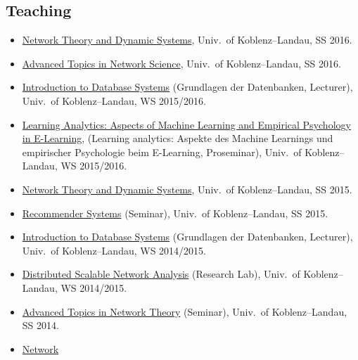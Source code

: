 \documentclass[line,mm]{res}
\begin{document}
\begin{resume}
\section{Teaching}
\begin{itemize}
\item 
  \href{https://west.uni-koblenz.de/en/studying/courses/ss16/network-theory-and-dynamic-systems}{Network
    Theory and Dynamic Systems}, Univ.\ of Koblenz--Landau, SS 2016.
\item
  \href{https://west.uni-koblenz.de/en/studying/courses/ss16/seminar}{Advanced
    Topics in Network Science}, Univ.\ of Koblenz--Landau, SS 2016. 
\item
  \href{https://west.uni-koblenz.de/en/studium/lehrveranstaltungen/ws1516/grundlagen-der-datenbanken}{Introduction
    to Database Systems} (Grundlagen der Datenbanken, 
  Lecturer), Univ.\ of Koblenz--Landau, WS 2015/2016.
\item 
  \href{https://west.uni-koblenz.de/en/studium/lehrveranstaltungen/ws1516/proseminar-learning-analytics}{Learning
  Analytics: Aspects of Machine Learning and Empirical Psychology in E-Learning}, (Learning
    analytics: Aspekte des Machine Learnings und empirischer Psychologie
    beim E-Learning, Proseminar), Univ.\ of Koblenz--Landau, WS 2015/2016.
\item 
  \href{https://west.uni-koblenz.de/en/studium/lehrveranstaltungen/ss15/network-theory-dynamic-systems}{Network
    Theory and Dynamic Systems}, Univ.\ of Koblenz--Landau, SS 2015.
\item
  \href{https://west.uni-koblenz.de/en/studium/lehrveranstaltungen/ss15/recommender-systems}{Recommender
    Systems} (Seminar), Univ.\ of Koblenz--Landau, SS 2015.
\item
  \href{https://web.west.uni-koblenz.de/en/studium/lehrveranstaltungen/ws1415/gddb}{Introduction
    to Database Systems} (Grundlagen der Datenbanken, 
  Lecturer), Univ.\ of Koblenz--Landau, WS 2014/2015.
\item
  \href{https://web.west.uni-koblenz.de/en/studium/lehrveranstaltungen/ws1415/forschungspraktikum}{Distributed
    Scalable Network Analysis} (Research Lab), Univ.\ of
  Koblenz--Landau, WS 2014/2015. 
\item
  \href{http://www.uni-koblenz-landau.de/campus-koblenz/fb4/west/teaching/ss14/seminar}{Advanced
    Topics in Network Theory} (Seminar), Univ.\ of Koblenz--Landau, SS 2014. 
\item 
  \href{http://www.uni-koblenz-landau.de/campus-koblenz/fb4/west/teaching/ss14/network-theory-and-dynamic-systems}{Network
}
\end{itemize}
\end{resume}
\end{document}
